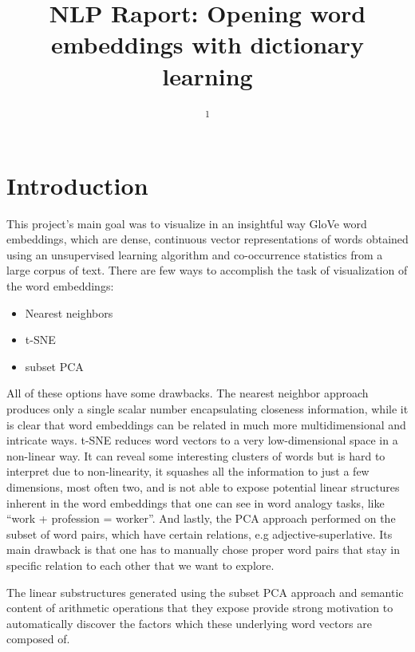 \documentclass[10pt, a4paper, twocolumn]{article} %
\title{NLP Raport: Opening word embeddings with dictionary learning} %
\author{
	\authorstyle{Maksymilian Szmelczyński\textsuperscript{1}} %
	\newline\newline %
	\textsuperscript{1}\institution{University of  Warsaw, Warsaw, Poland}\\ %
}
\begin{document}
\maketitle %

\thispagestyle{firstpage} %


\section{Introduction}

This project’s main goal was to visualize in an insightful way GloVe word embeddings, which are dense, continuous vector representations of words obtained using an unsupervised learning algorithm and co-occurrence statistics from a large corpus of text. There are few ways to accomplish the task of visualization of the word embeddings:

\begin{itemize}
	\item Nearest neighbors 
	\item t-SNE
	\item subset PCA
\end{itemize}

All of these options have some drawbacks. The nearest neighbor approach produces only a single scalar number encapsulating closeness information, while it is clear that word embeddings can be related in much more multidimensional and intricate ways. t-SNE reduces word vectors to a very low-dimensional space in a non-linear way. It can reveal some interesting clusters of words but is hard to interpret due to non-linearity, it squashes all the information to just a few dimensions, most often two, and is not able to expose potential linear structures inherent in the word embeddings that one can see in word analogy tasks, like “work + profession = worker”. And lastly, the PCA approach performed on the subset of word pairs, which have certain relations, e.g adjective-superlative. Its main drawback is that one has to manually chose proper word pairs that stay in specific relation to each other that we want to explore. 

The linear substructures generated using the subset PCA approach and semantic content of arithmetic operations that they expose provide strong motivation to automatically discover the factors which these underlying word vectors are composed of.
\end{document}
